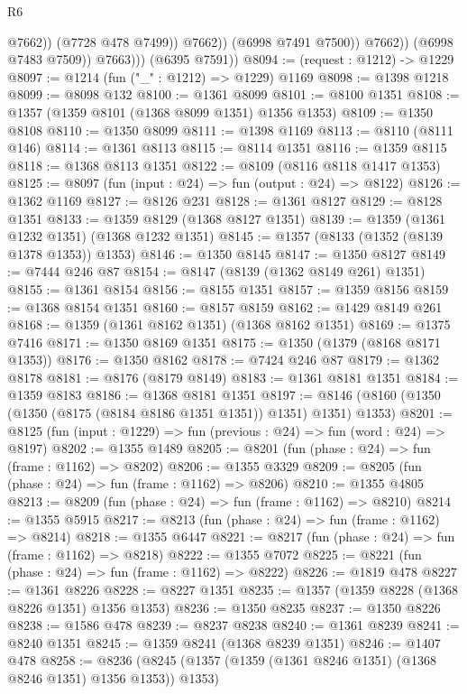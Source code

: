 \begin{lexlean}{R6}
\begin{coremodule}
                              @7662))
                          (@7728 @478 @7499))
                        @7662))
                    (@6998 @7491 @7500))
                  @7662))
              (@6998 @7483 @7509))
            @7663)))
      (@6395 @7591))
@8094 := (request : @1212) -> @1229
@8097 := @1214 (fun ("_" : @1212) => @1229) @1169
@8098 := @1398 @1218
@8099 := @8098 @132
@8100 := @1361 @8099
@8101 := @8100 @1351
@8108 := @1357 (@1359 @8101 (@1368 @8099 @1351) @1356 @1353)
@8109 := @1350 @8108
@8110 := @1350 @8099
@8111 := @1398 @1169
@8113 := @8110 (@8111 @146)
@8114 := @1361 @8113
@8115 := @8114 @1351
@8116 := @1359 @8115
@8118 := @1368 @8113 @1351
@8122 := @8109 (@8116 @8118 @1417 @1353)
@8125 := @8097 (fun (input : @24) => fun (output : @24) => @8122)
@8126 := @1362 @1169
@8127 := @8126 @231
@8128 := @1361 @8127
@8129 := @8128 @1351
@8133 := @1359 @8129 (@1368 @8127 @1351)
@8139 := @1359 (@1361 @1232 @1351) (@1368 @1232 @1351)
@8145 := @1357 (@8133 (@1352 (@8139 @1378 @1353)) @1353)
@8146 := @1350 @8145
@8147 := @1350 @8127
@8149 := @7444 @246 @87
@8154 := @8147 (@8139 (@1362 @8149 @261) @1351)
@8155 := @1361 @8154
@8156 := @8155 @1351
@8157 := @1359 @8156
@8159 := @1368 @8154 @1351
@8160 := @8157 @8159
@8162 := @1429 @8149 @261
@8168 := @1359 (@1361 @8162 @1351) (@1368 @8162 @1351)
@8169 := @1375 @7416
@8171 := @1350 @8169 @1351
@8175 := @1350 (@1379 (@8168 @8171 @1353))
@8176 := @1350 @8162
@8178 := @7424 @246 @87
@8179 := @1362 @8178
@8181 := @8176 (@8179 @8149)
@8183 := @1361 @8181 @1351
@8184 := @1359 @8183
@8186 := @1368 @8181 @1351
@8197 := @8146 (@8160 (@1350 (@1350 (@8175 (@8184 @8186 @1351 @1351)) @1351) @1351) @1353)
@8201 := @8125 (fun (input : @1229) => fun (previous : @24) => fun (word : @24) => @8197)
@8202 := @1355 @1489
@8205 := @8201 (fun (phase : @24) => fun (frame : @1162) => @8202)
@8206 := @1355 @3329
@8209 := @8205 (fun (phase : @24) => fun (frame : @1162) => @8206)
@8210 := @1355 @4805
@8213 := @8209 (fun (phase : @24) => fun (frame : @1162) => @8210)
@8214 := @1355 @5915
@8217 := @8213 (fun (phase : @24) => fun (frame : @1162) => @8214)
@8218 := @1355 @6447
@8221 := @8217 (fun (phase : @24) => fun (frame : @1162) => @8218)
@8222 := @1355 @7072
@8225 := @8221 (fun (phase : @24) => fun (frame : @1162) => @8222)
@8226 := @1819 @478
@8227 := @1361 @8226
@8228 := @8227 @1351
@8235 := @1357 (@1359 @8228 (@1368 @8226 @1351) @1356 @1353)
@8236 := @1350 @8235
@8237 := @1350 @8226
@8238 := @1586 @478
@8239 := @8237 @8238
@8240 := @1361 @8239
@8241 := @8240 @1351
@8245 := @1359 @8241 (@1368 @8239 @1351)
@8246 := @1407 @478
@8258 := @8236 (@8245 (@1357 (@1359 (@1361 @8246 @1351) (@1368 @8246 @1351) @1356 @1353)) @1353)

\end{coremodule}
\end{lexlean}
